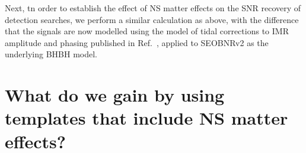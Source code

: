 \documentclass[aps,prd,amsmath,floats,floatfix, twocolumn,
superscriptaddress,nofootinbib,showpacs]{revtex4-1}
\begin{document}
Next, tn order to establish the effect of NS matter effects on the SNR recovery of 
detection searches, we perform a similar calculation as above, with the
difference that the signals are now modelled using the model of tidal 
corrections to IMR amplitude and phasing published in 
Ref.~\cite{Lackey:2013axa}, applied to SEOBNRv2 as the underlying BHBH model.


\section{What do we gain by using templates that include NS matter effects?}
\end{document}
